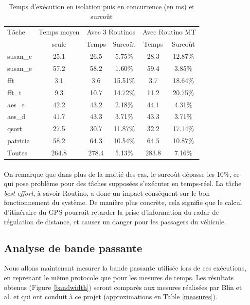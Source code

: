 \begin{table}[h]
\centering
\begin{tabular}{l|c|c|c|c|c}
Tâche & Temps moyen & \multicolumn{2}{c|}{Avec 3 Routinos} & 
\multicolumn{2}{c}{Avec Routino MT} \\
 & seule & Temps & Surcoût & Temps & Surcoût\\
\hline
susan\_c & 25.1 & 26.5 & 5.75\%  & 28.3 & 12.87\%\\
susan\_e & 57.2 & 58.2 & 1.60\%  & 59.4 & 3.85\%\\
fft      & 3.1  & 3.6  & 15.51\% & 3.7  & 18.64\%\\
fft\_i   & 9.3  & 10.7 & 14.72\% & 11.2 & 20.75\%\\
aes\_e   & 42.2 & 43.2 & 2.18\%  & 44.1 & 4.31\%\\
aes\_d   & 41.7 & 43.3 & 3.71\%  & 43.3 & 3.71\%\\
qsort    & 27.5 & 30.7 & 11.87\% & 32.2 & 17.14\%\\
patricia & 58.2 & 64.3 & 10.54\% & 64.5 & 10.87\%\\
\hline
Toutes   & 264.8 & 278.4 & 5.13\%  & 283.8 & 7.16\%\\
\end{tabular}
\caption{Temps d'exécution en isolation puis en concurrence (en ms) et surcoût}
\label{timebench}
\end{table}

\paragraph{}
On remarque que dans plus de la moitié des cas, le surcoût dépasse les 10\%, ce
qui pose problème pour des tâches supposées s'exécuter en temps-réel. La tâche
\textit{best effort}, à savoir Routino, a donc un impact conséquent sur le bon
fonctionnement du système. De manière plus concrète, cela signifie que le 
calcul d'itinéraire du GPS pourrait retarder la prise d'information du radar
de régulation de distance, et causer un danger pour les passagers du véhicule.

\subsection{Analyse de bande passante}
Nous allons maintenant mesurer la bande passante utilisée lors de ces
exécutions, en reprenant le même protocole que pour les mesures de temps. Les
résultats obtenus (Figure \ref{bandwidth}) seront comparés aux
mesures réalisées par Blin et al. \cite{blin_protecting_2015} et qui ont
conduit à ce projet (approximations en Table \ref{measures}).

